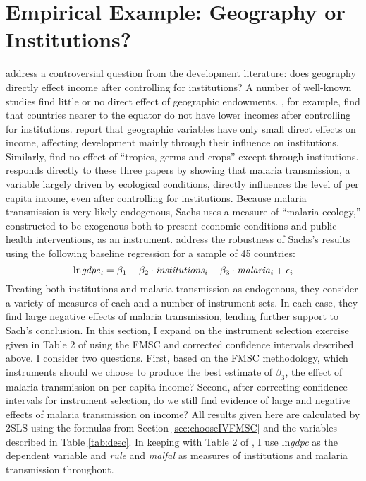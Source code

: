\section{Empirical Example: Geography or Institutions?}
\label{sec:application}
\cite{Carstensen2006} address a controversial question from the development literature: does geography directly effect income after controlling for institutions? A number of well-known studies find little or no direct effect of geographic endowments. \cite{Acemoglu}, for example, find that countries nearer to the equator do not have lower incomes after controlling for institutions. \cite{Rodrik} report that geographic variables have only small direct effects on income, affecting development mainly through their influence on institutions. Similarly, \cite{Easterly} find no effect of ``tropics, germs and crops'' except through institutions. \cite{Sachs} responds directly to these three papers by showing that malaria transmission, a variable largely driven by ecological conditions, directly influences the level of per capita income, even after controlling for institutions. Because malaria transmission  is very likely endogenous, Sachs uses a measure of ``malaria ecology,'' constructed to be exogenous both to present economic conditions and public health interventions, as an instrument. \cite{Carstensen2006} address the robustness of Sachs's results using the following baseline regression for a sample of 45 countries:
\begin{equation}
	\mbox{ln\emph{gdpc}}_i = \beta_1 + \beta_2 \cdot \mbox{\emph{institutions}}_i + \beta_3 \cdot \mbox{\emph{malaria}}_i + \epsilon_i
\end{equation}
Treating both institutions and malaria transmission as endogenous, they consider a variety of measures of each and a number of instrument sets. In each case, they find large negative effects of malaria transmission, lending further support to Sach's conclusion. In this section, I expand on the instrument selection exercise given in Table 2 of \cite{Carstensen2006} using the FMSC and corrected confidence intervals described above. I consider two questions. First, based on the FMSC methodology, which instruments should we choose to produce the best estimate of $\beta_3$, the effect of malaria transmission on per capita income? Second, after correcting confidence intervals for instrument selection, do we still find evidence of large and negative effects of malaria transmission on income? All results given here are calculated by 2SLS using the formulas from Section \ref{sec:chooseIVFMSC} and the variables described in Table \ref{tab:desc}. In keeping with Table 2 of \cite{Carstensen2006}, I use ln\emph{gdpc} as the dependent variable and \emph{rule} and \emph{malfal} as measures of institutions and malaria transmission throughout. 


